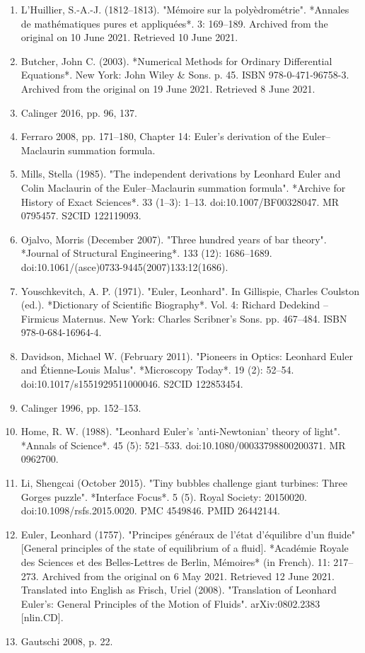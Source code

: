 \begin{enumerate}
\item L'Huillier, S.-A.-J. (1812–1813). "Mémoire sur la polyèdrométrie". *Annales de mathématiques pures et appliquées*. 3: 169–189. Archived from the original on 10 June 2021. Retrieved 10 June 2021.
\item Butcher, John C. (2003). *Numerical Methods for Ordinary Differential Equations*. New York: John Wiley & Sons. p. 45. ISBN 978-0-471-96758-3. Archived from the original on 19 June 2021. Retrieved 8 June 2021.
\item Calinger 2016, pp. 96, 137.
\item Ferraro 2008, pp. 171–180, Chapter 14: Euler's derivation of the Euler–Maclaurin summation formula.
\item Mills, Stella (1985). "The independent derivations by Leonhard Euler and Colin Maclaurin of the Euler–Maclaurin summation formula". *Archive for History of Exact Sciences*. 33 (1–3): 1–13. doi:10.1007/BF00328047. MR 0795457. S2CID 122119093.

\item Ojalvo, Morris (December 2007). "Three hundred years of bar theory". *Journal of Structural Engineering*. 133 (12): 1686–1689. doi:10.1061/(asce)0733-9445(2007)133:12(1686).
\item Youschkevitch, A. P. (1971). "Euler, Leonhard". In Gillispie, Charles Coulston (ed.). *Dictionary of Scientific Biography*. Vol. 4: Richard Dedekind – Firmicus Maternus. New York: Charles Scribner's Sons. pp. 467–484. ISBN 978-0-684-16964-4.
\item Davidson, Michael W. (February 2011). "Pioneers in Optics: Leonhard Euler and Étienne-Louis Malus". *Microscopy Today*. 19 (2): 52–54. doi:10.1017/s1551929511000046. S2CID 122853454.
\item Calinger 1996, pp. 152–153.
\item Home, R. W. (1988). "Leonhard Euler's 'anti-Newtonian' theory of light". *Annals of Science*. 45 (5): 521–533. doi:10.1080/00033798800200371. MR 0962700.
\item Li, Shengcai (October 2015). "Tiny bubbles challenge giant turbines: Three Gorges puzzle". *Interface Focus*. 5 (5). Royal Society: 20150020. doi:10.1098/rsfs.2015.0020. PMC 4549846. PMID 26442144.
\item Euler, Leonhard (1757). "Principes généraux de l'état d'équilibre d'un fluide" [General principles of the state of equilibrium of a fluid]. *Académie Royale des Sciences et des Belles-Lettres de Berlin, Mémoires* (in French). 11: 217–273. Archived from the original on 6 May 2021. Retrieved 12 June 2021. Translated into English as Frisch, Uriel (2008). "Translation of Leonhard Euler's: General Principles of the Motion of Fluids". arXiv:0802.2383 [nlin.CD].
\item Gautschi 2008, p. 22.



\end{enumerate}
